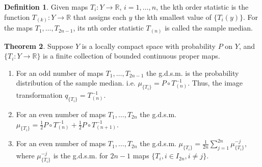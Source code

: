 \documentclass[sn-mathphys-num]{sn-jnl}%
\theoremstyle{thmstyleone}%
\theoremstyle{definition}
\newtheorem{theorem}{Theorem}%
\newtheorem{definition}[theorem]{Definition}
\begin{document}
\begin{definition}
Given maps $T_i: Y \longrightarrow \mathbb{R}$, $ i=1, \ldots, n$, the kth order statistic 
is the function $T_{(k)} : Y  \longrightarrow \mathbb{R}$ that assigns each $y$ the kth smallest value
of $\{ T_i(y)\}$. For  the maps $T_1, \ldots, T_{2n-1}$, its nth order statistic $T_{(n)}$ is called the sample median.
\end{definition} 

\begin{theorem} \label{SaMeProbD}
Suppose $Y$ is a locally compact space with probability $P$ on $Y$,  and  $\{T_i : Y \longrightarrow \mathbb{R} \}$ is a finite collection of bounded continuous proper maps. 
\begin{enumerate}[leftmargin=0.25in, label=(\roman*),ref=(\roman*)]
\item \label{oddSaMe}
For an odd number of maps $T_1, \ldots, T_{2n -1}$ the g.d.s.m. 
is the probability distribution of the sample median. i.e. $ \mu_{\{T_i\}} = P \circ T_{(n)}^{-1}$. Thus, the image transformation $q_{\{T_i\}} = T_{(n)}^{-1}$.
\item \label{evenSaMe}
For an even number of maps $T_1, \ldots, T_{2n} $ the g.d.s.m. $ \mu_{\{T_i\}} = \frac12 P \circ T_{(n)}^{-1} + \frac12 P \circ T_{(n+1)}^{-1}$.
\item \label{evenSaMeAlf}
 For an even number of maps $T_1, \ldots, T_{2n} $  the g.d.s.m. $ \mu_{\{T_i\}} = \frac{1}{2n} \sum_{j=1}^{2n}  \mu_{\{T_i\}}^{-j}$, where 
$ \mu_{\{T_i\}}^{-j}$ is the g.d.s.m. for  $2n-1$ maps $\{T_i,   i \in I_{2n}, i \ne j  \}$.
\end{enumerate}
\end{theorem}
\end{document}
